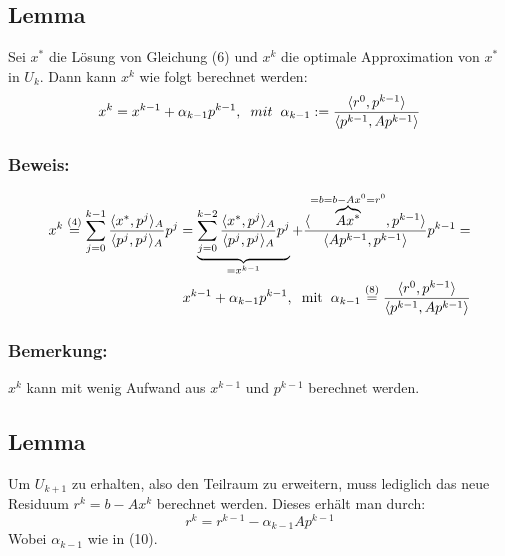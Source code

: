 \documentclass{article}
\begin{document}
\subsection{Lemma}
Sei $x^{*}$ die Lösung von Gleichung (6) und $x^{k}$ die optimale Approximation von $x^{*}$ in $U_{k}$. Dann kann $x^{k}$ wie folgt berechnet werden:
\begin{equation}
x^{k} = x^{k-1} + \alpha_{k-1}p^{k-1}, \hspace{2mm} mit \hspace{2mm} \alpha_{k-1} := \frac {\langle r^{0}, p^{k-1} \rangle} {\langle {p^{k-1}, Ap^{k-1}} \rangle}
\end{equation}

\subsubsection{Beweis:}
\begin{align*}
\begin{split}
x^{k} \overset{(4)}{=}
\sum_{j=0}^{k-1} \frac {\langle x^{*}, p^{j} \rangle _{A}} {\langle {p^{j}, p^{j}} \rangle _{A}} p^{j} =
\underbrace{\sum_{j=0}^{k-2} \frac {\langle x^{*}, p^{j} \rangle _{A}} {\langle {p^{j}, p^{j}} \rangle _{A}} p^{j}}_{=x^{k-1}} +
\frac {\langle \overbrace{Ax^{*}}^{=b=b-Ax^{0}=r^{0}}, p^{k-1} \rangle} {\langle {Ap^{k-1}, p^{k-1}} \rangle} p^{k-1} =\\
x^{k-1} + \alpha_{k-1}p^{k-1}, \hspace{2mm} \textnormal{mit} \hspace{2mm} \alpha_{k-1} \overset{(8)}{=} \frac {\langle r^{0}, p^{k-1} \rangle} {\langle {p^{k-1}, Ap^{k-1}} \rangle}
\end{split}
\end{align*}

\subsubsection{Bemerkung:}
$x^{k}$ kann mit wenig Aufwand aus $x^{k-1}$ und $p^{k-1}$ berechnet werden.

\subsection{Lemma}
Um $U_{k+1}$ zu erhalten, also den Teilraum zu erweitern, muss lediglich das neue Residuum $r^{k} = b - Ax^{k}$ berechnet werden. Dieses erhält man durch:
\begin{equation}
r^{k} = r^{k-1} - \alpha_{k-1}Ap^{k-1}
\end{equation}
Wobei $\alpha_{k-1}$ wie in (10).
\end{document}
